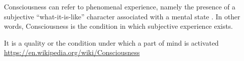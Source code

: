 \documentclass[a4paper]{article}
\title{}
\date{}
\author{Mohammad Rahmani}
\begin{document}
    \maketitle
    Consciousness can refer to phenomenal experience, namely the presence of a subjective ``what-it-is-like'' character associated with a mental state \cite{block-1995-on-a-confusion-about-a-function-of-consciousness}. In other words, Consciousness is the condition in which subjective experience exists.
    
    It is a quality or the condition under which a part of mind is activated
    \url{https://en.wikipedia.org/wiki/Consciousness}
    

    
    
\end{document}
